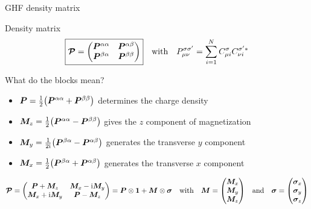 \documentclass[aspectratio=169,9pt]{beamer}
\newcommand{\bP}{\boldsymbol{P}}
\newcommand{\bI}{\boldsymbol{1}}
\newcommand{\bM}{\boldsymbol{M}}
\newcommand{\ii}{\mathrm{i}}
\begin{document}
\begin{frame}{GHF density matrix}
	\begin{block}{Density matrix}
    	\begin{equation*}
    		\boxed{
    			\boldsymbol{\mathcal{P}} =
    			\mqty(
    				\bP^{\alpha\alpha} & \bP^{\alpha\beta}\\
    				\bP^{\beta\alpha} & \bP^{\beta\beta}
    			)
    		}
    		\qq{with}
    		P_{\mu\nu}^{\sigma\sigma'}
    		=
    		\sum_{i=1}^{N}C_{\mu i}^{\sigma}C_{\nu i}^{\sigma' *}
    	\end{equation*}
	\end{block}

	\begin{block}{What do the blocks mean?}
		\begin{itemize}
			\item $\bP = \frac{1}{2} \qty(\bP^{\alpha\alpha}+\bP^{\beta\beta})$ determines the \alert{charge density}
			\item $\bM_z = \frac{1}{2} \qty(\bP^{\alpha\alpha} - \bP^{\beta\beta})$ gives the $z$ component of \alert{magnetization}
			\item $\bM_y = \frac{1}{2\ii} \qty(\bP^{\beta\alpha} - \bP^{\alpha\beta})$ generates the transverse $y$ component
			\item $\bM_x = \frac{1}{2} \qty(\bP^{\beta\alpha} + \bP^{\alpha\beta})$ generates the transverse $x$ component
		\end{itemize}
	\end{block}

	\begin{equation*}
		\boldsymbol{\mathcal{P}} 
		= \mqty(
		\bP + \bM_z & \bM_x - \ii \bM_y
		\\
		\bM_x + \ii \bM_y & \bP - \bM_z
		)
		= \bP \otimes \bI + \bM \otimes \boldsymbol{\sigma}
		\qq{with}
		\bM = \mqty( \bM_x \\ \bM_y \\ \bM_z) 
		\qq{and}
		\boldsymbol{\sigma} = \mqty( \boldsymbol{\sigma}_x \\ \boldsymbol{\sigma}_y \\ \boldsymbol{\sigma}_z) 
	\end{equation*}
\end{frame}
\end{document}
